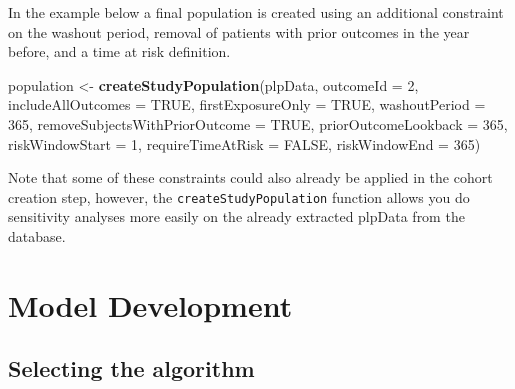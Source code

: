 \documentclass[]{article}
\newenvironment{Shaded}{\begin{snugshade}}{\end{snugshade}}
\newcommand{\KeywordTok}[1]{\textcolor[rgb]{0.13,0.29,0.53}{\textbf{#1}}}
\newcommand{\DataTypeTok}[1]{\textcolor[rgb]{0.13,0.29,0.53}{#1}}
\newcommand{\DecValTok}[1]{\textcolor[rgb]{0.00,0.00,0.81}{#1}}
\newcommand{\StringTok}[1]{\textcolor[rgb]{0.31,0.60,0.02}{#1}}
\newcommand{\OtherTok}[1]{\textcolor[rgb]{0.56,0.35,0.01}{#1}}
\newcommand{\NormalTok}[1]{#1}
\begin{document}
In the example below a final population is created using an additional
constraint on the washout period, removal of patients with prior
outcomes in the year before, and a time at risk definition.

\begin{Shaded}
\begin{Highlighting}[]
\NormalTok{population <-}\StringTok{ }\KeywordTok{createStudyPopulation}\NormalTok{(plpData, }
\DataTypeTok{outcomeId =} \DecValTok{2}\NormalTok{, }
\DataTypeTok{includeAllOutcomes =} \OtherTok{TRUE}\NormalTok{, }
\DataTypeTok{firstExposureOnly =} \OtherTok{TRUE}\NormalTok{, }
\DataTypeTok{washoutPeriod =} \DecValTok{365}\NormalTok{, }
\DataTypeTok{removeSubjectsWithPriorOutcome =} \OtherTok{TRUE}\NormalTok{, }
\DataTypeTok{priorOutcomeLookback =} \DecValTok{365}\NormalTok{,}
\DataTypeTok{riskWindowStart =} \DecValTok{1}\NormalTok{,}
\DataTypeTok{requireTimeAtRisk =} \OtherTok{FALSE}\NormalTok{,}
\DataTypeTok{riskWindowEnd =} \DecValTok{365}\NormalTok{)}
\end{Highlighting}
\end{Shaded}

Note that some of these constraints could also already be applied in the
cohort creation step, however, the \texttt{createStudyPopulation}
function allows you do sensitivity analyses more easily on the already
extracted plpData from the database.

\newpage

\section{Model Development}\label{model-development}

\subsection{Selecting the algorithm}\label{selecting-the-algorithm}
\end{document}
